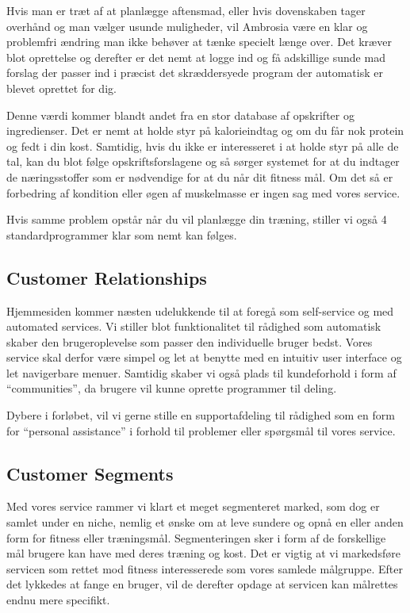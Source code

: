 \documentclass{article}
\begin{document}
Hvis man er træt af at planlægge aftensmad, eller hvis dovenskaben tager overhånd og man vælger usunde muligheder, vil Ambrosia være en klar og problemfri ændring man ikke behøver at tænke specielt længe over. Det kræver blot oprettelse og derefter er det nemt at logge ind og få adskillige sunde mad forslag der passer ind i præcist det skræddersyede program der automatisk er blevet oprettet for dig. 

Denne værdi kommer blandt andet fra en stor database af opskrifter og ingredienser. Det er nemt at holde styr på kalorieindtag og om du får nok protein og fedt i din kost. Samtidig, hvis du ikke er interesseret i at holde styr på alle de tal, kan du blot følge opskriftsforslagene og så sørger systemet for at du indtager de næringsstoffer som er nødvendige for at du når dit fitness mål. Om det så er forbedring af kondition eller øgen af muskelmasse er ingen sag med vores service. 

Hvis samme problem opstår når du vil planlægge din træning, stiller vi også 4 standardprogrammer klar som nemt kan følges. 

\subsection{Customer Relationships}
Hjemmesiden kommer næsten udelukkende til at foregå som self-service og med automated services. Vi stiller blot funktionalitet til rådighed som automatisk skaber den brugeroplevelse som passer den individuelle bruger bedst. Vores service skal derfor være simpel og let at benytte med en intuitiv user interface og let navigerbare menuer. Samtidig skaber vi også plads til kundeforhold i form af “communities”, da brugere vil kunne oprette programmer til deling. 

Dybere i forløbet, vil vi gerne stille en supportafdeling til rådighed som en form for “personal assistance” i forhold til problemer eller spørgsmål til vores service. 

\subsection{Customer Segments}
Med vores service rammer vi klart et meget segmenteret marked, som dog er samlet under en niche, nemlig et ønske om at leve sundere og opnå en eller anden form for fitness eller træningsmål. Segmenteringen sker i form af de forskellige mål brugere kan have med deres træning og kost. Det er vigtig at vi markedsføre servicen som rettet mod fitness interesserede som vores samlede målgruppe. Efter det lykkedes at fange en bruger, vil de derefter opdage at servicen kan målrettes endnu mere specifikt.
\end{document}
